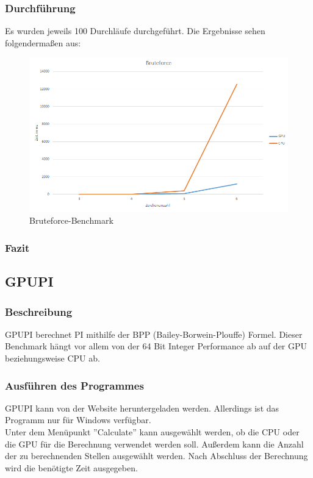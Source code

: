 \subsubsection{Durchführung}
Es wurden jeweils 100 Durchläufe durchgeführt.
Die Ergebnisse sehen folgendermaßen aus:
\begin{figure}[!h]
	\begin{center}
		\includegraphics[width=17cm]{images/bruteforce.png}
		\caption{Bruteforce-Benchmark}
	\end{center}
\end{figure}
\subsubsection{Fazit}
\newpage
\subsection{GPUPI}
\subsubsection{Beschreibung}
GPUPI berechnet PI mithilfe der BPP (Bailey-Borwein-Plouffe) Formel. Dieser Benchmark hängt vor allem von der 64 Bit Integer Performance ab auf der GPU beziehungsweise CPU ab.
\subsubsection{Ausführen des Programmes}
GPUPI kann von der Website heruntergeladen werden. \cite{gpupi} Allerdings ist das Programm nur für Windows verfügbar.\\
Unter dem Menüpunkt ''Calculate'' kann ausgewählt werden, ob die CPU oder die GPU für die Berechnung verwendet werden soll. Außerdem kann die Anzahl der zu berechnenden Stellen ausgewählt werden. Nach Abschluss der Berechnung wird die benötigte Zeit ausgegeben.
